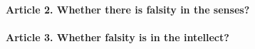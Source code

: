 \documentclass{ucetd}
\begin{document}
\paragraph{Article 2. Whether there is falsity in the senses?}
\paragraph{Article 3. Whether falsity is in the intellect?}
\end{document}
